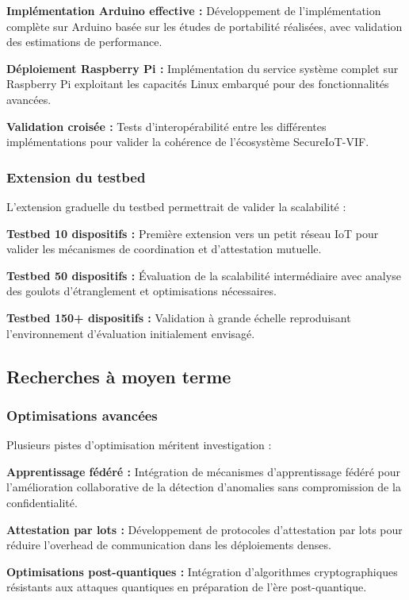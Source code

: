 \textbf{Implémentation Arduino effective :} Développement de l'implémentation complète sur Arduino basée sur les études de portabilité réalisées, avec validation des estimations de performance.

\textbf{Déploiement Raspberry Pi :} Implémentation du service système complet sur Raspberry Pi exploitant les capacités Linux embarqué pour des fonctionnalités avancées.

\textbf{Validation croisée :} Tests d'interopérabilité entre les différentes implémentations pour valider la cohérence de l'écosystème SecureIoT-VIF.

\subsubsection{Extension du testbed}

L'extension graduelle du testbed permettrait de valider la scalabilité :

\textbf{Testbed 10 dispositifs :} Première extension vers un petit réseau IoT pour valider les mécanismes de coordination et d'attestation mutuelle.

\textbf{Testbed 50 dispositifs :} Évaluation de la scalabilité intermédiaire avec analyse des goulots d'étranglement et optimisations nécessaires.

\textbf{Testbed 150+ dispositifs :} Validation à grande échelle reproduisant l'environnement d'évaluation initialement envisagé.

\subsection{Recherches à moyen terme}

\subsubsection{Optimisations avancées}

Plusieurs pistes d'optimisation méritent investigation :

\textbf{Apprentissage fédéré :} Intégration de mécanismes d'apprentissage fédéré pour l'amélioration collaborative de la détection d'anomalies sans compromission de la confidentialité.

\textbf{Attestation par lots :} Développement de protocoles d'attestation par lots pour réduire l'overhead de communication dans les déploiements denses.

\textbf{Optimisations post-quantiques :} Intégration d'algorithmes cryptographiques résistants aux attaques quantiques en préparation de l'ère post-quantique.

